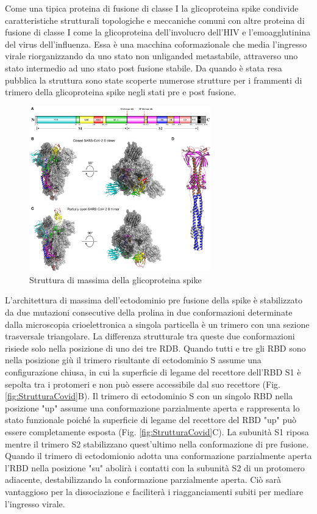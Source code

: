 Come una tipica proteina di fusione di classe I la glicoproteina spike condivide caratteristiche strutturali topologiche e meccaniche comuni con altre proteina di fusione di classe I come la glicoproteina dell'involucro dell'HIV e l'emoagglutinina del virus dell'influenza. Essa è una macchina coformazionale che media l'ingresso virale riorganizzando da uno stato non unliganded metastabile, attraverso uno stato intermedio ad uno stato post fusione stabile. Da quando è stata resa pubblica la struttura sono state scoperte numerose strutture per i frammenti di trimero della glicoproteina spike negli stati pre e post fusione. 

\begin{figure}
	\centering
	\includegraphics[width=0.7\textwidth]{Immagini/Composizione_strutturale.png}
	\caption{Struttura di massima della glicoproteina spike}
	\label{fig:StrutturaMassima}
\end{figure}

L'architettura di massima dell'ectodominio pre fusione della spike è stabilizzato da due mutazioni consecutive della prolina in due conformazioni determinate dalla microscopia crioelettronica a singola particella è un trimero con una sezione trasversale triangolare. La differenza strutturale tra queste due conformazioni risiede solo nella posizione di uno dei tre RDB. Quando tutti e tre gli RBD sono nella posizione giù il trimero risultante di ectodominio S assume una configurazione chiusa, in cui la superficie di legame del recettore dell'RBD S1 è sepolta tra i protomeri e non può essere accessibile dal suo recettore (Fig. \ref{fig:StrutturaCovid}B). Il trimero di ectodominio S con un singolo RBD nella posizione "up" assume una conformazione parzialmente aperta e rappresenta lo stato funzionale poiché la superficie di legame del recettore del RBD "up" può essere completamente esposta (Fig. \ref{fig:StrutturaCovid}C). La subunità S1 riposa mentre il trimero S2 stabilizzano quest'ultimo nella conformazione di pre fusione. Quando il trimero di ectodomionio adotta una conformazione parzialmente aperta l'RBD nella posizione "su" abolirà i contatti con la subunità S2 di un protomero adiacente, destabilizzando la conformazione parzialmente aperta. Ciò sarà vantaggioso per la dissociazione e faciliterà i riagganciamenti subiti per mediare l'ingresso virale. 

